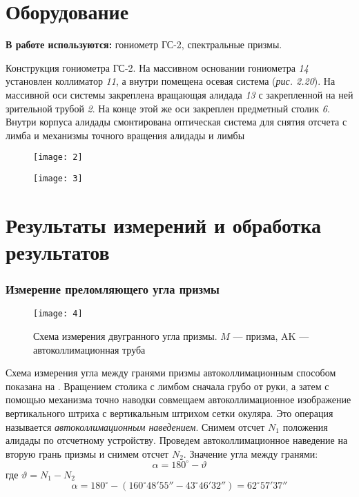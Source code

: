 \documentclass[a4paper, 12pt]{article}
\begin{document}
\section{Оборудование}
\textbf{В работе используются:} гониометр ГС-2, спектральные призмы.

Конструкция гониометра ГС-2. На массивном основании гониометра
\textsl{14} установлен коллиматор \textsl{11}, а внутри помещена
осевая система (\textsl{рис. 2.20}). На массивной оси системы закреплена
вращающая алидада \textsl{13} с закрепленной на ней зрительной трубой
\textsl{2}. На конце этой же оси закреплен предметный столик
\textsl{6}. Внутри корпуса алидады смонтирована оптическая система для
снятия отсчета с лимба и механизмы точного вращения алидады и лимбы

\begin{figure}[H]
    \texttt{[image: 2]} 
    \label{fig:2}
\end{figure}
\begin{figure}[H]
    \texttt{[image: 3]} 
    \label{fig:3}
\end{figure}

\section{Результаты измерений и обработка результатов}
\subsubsection*{Измерение преломляющего угла призмы}

\begin{wrapfigure}{r}{0.5\linewidth}
    \vspace{-10pt}
    \texttt{[image: 4]}
    \caption{Схема измерения двугранного угла призмы. $M$ --- призма,
    AK --- автоколлимационная труба}
    \label{fig:4}
\end{wrapfigure}

Схема измерения угла между гранями призмы автоколлимационным способом
показана на . Вращением столика с лимбом сначала грубо от
руки, а затем с помощью механизма точно наводки совмещаем
автоколлимационное изображение вертикального штриха с вертикальным
штрихом сетки окуляра. Это операция называется
\textit{автоколлимационным наведением}. Снимем отсчет $N_1$ положения
алидады по отсчетному устройству. Проведем автоколлимационное
наведение на вторую грань призмы и снимем отсчет $N_2$. Значение угла
между гранями:
\[
    \alpha = 180^\circ - \vartheta
\]
где $\vartheta = N_1 - N_2$
\[
    \alpha = 180^\circ - (160^\circ48'55'' - 43^\circ46'32'') =
    62^\circ 57' 37''
\]
\end{document}
